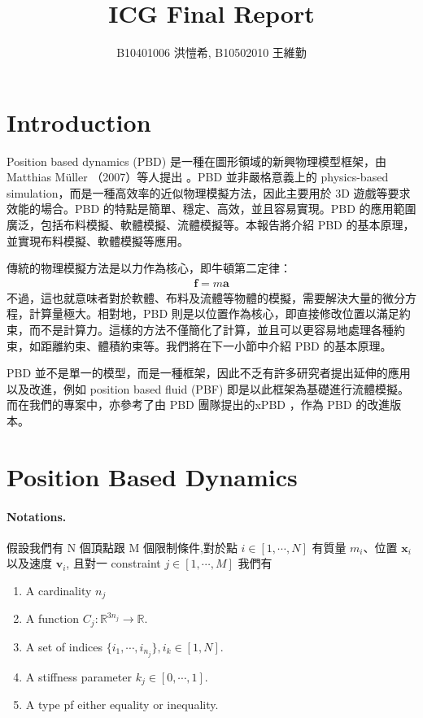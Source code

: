 \documentclass{article}
\title{ICG Final Report}
\author{B10401006 洪愷希, B10502010 王維勤}
\date{}
\begin{document}
\nocite{*}
\setlength{\parindent}{0pt}

\maketitle

\section*{Introduction}
Position based dynamics (PBD) 是一種在圖形領域的新興物理模型框架，由 Matthias M{\"u}ller （2007）等人提出 \cite*{Muller2007-ht}。PBD 並非嚴格意義上的 physics-based simulation，而是一種高效率的近似物理模擬方法，因此主要用於 3D 遊戲等要求效能的場合。PBD 的特點是簡單、穩定、高效，並且容易實現。PBD 的應用範圍廣泛，包括布料模擬、軟體模擬、流體模擬等。本報告將介紹 PBD 的基本原理，並實現布料模擬、軟體模擬等應用。

傳統的物理模擬方法是以力作為核心，即牛頓第二定律：
\begin{align}
  \mathbf{f} = m \mathbf{a}
\end{align}
不過，這也就意味者對於軟體、布料及流體等物體的模擬，需要解決大量的微分方程，計算量極大。相對地，PBD 則是以位置作為核心，即直接修改位置以滿足約束，而不是計算力。這樣的方法不僅簡化了計算，並且可以更容易地處理各種約束，如距離約束、體積約束等。我們將在下一小節中介紹 PBD 的基本原理。

PBD 並不是單一的模型，而是一種框架，因此不乏有許多研究者提出延伸的應用以及改進，例如 position based fluid (PBF) 即是以此框架為基礎進行流體模擬。而在我們的專案中，亦參考了由 PBD 團隊提出的xPBD \cite*{Macklin2016-fh}，作為 PBD 的改進版本。

\section*{Position Based Dynamics}
\paragraph{Notations.}
假設我們有 N 個頂點跟 M 個限制條件,對於點 $i \in [1, \cdots , N]$ 有質量 $m_i$、位置 $\mathbf{x}_i$ 以及速度 $\mathbf{v}_i$,
且對一 constraint $j \in [1, \cdots ,M]$ 我們有
\begin{enumerate}
  \item
        A cardinality $n_j$
  \item  A function $C_j: \mathbb{R}^{3n_j} \to \mathbb{R}$.
  \item  A set of indices $\{ i_1, \cdots , i_{n_j} \}, i_k \in [1,N]$.
  \item  A stiffness parameter $k_j \in [0,\cdots ,1]$.
  \item  A type pf either equality or inequality.
\end{enumerate}
\end{document}
